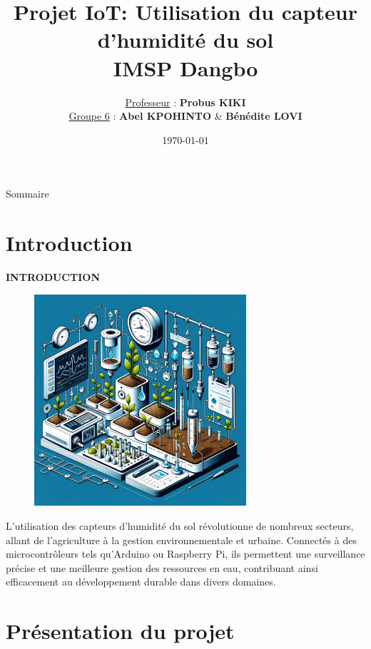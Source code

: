 \documentclass{beamer}
\title{ Projet IoT: Utilisation du capteur d'humidité du sol \\ {\small IMSP Dangbo} }
\author{{\small \underline{Professeur} :} \textbf{Probus KIKI} \\ {\small \underline{Groupe 6} :} \textbf{Abel KPOHINTO} \& \textbf{Bénédite LOVI}}
\date{\today}
\begin{document}
	
	\frame{\titlepage}
	\begin{frame}{Sommaire}
    		\tableofcontents
	\end{frame}
	
	\section{ Introduction }
	\begin{frame}{\textbf{INTRODUCTION}}
	\begin{figure}
    \centering
    \includegraphics[width=0.7\textwidth]{intro.png}
	\end{figure}

        L'utilisation des capteurs d'humidité du sol révolutionne de nombreux secteurs, allant de l'agriculture à la gestion environnementale et urbaine. Connectés à des microcontrôleurs tels qu'Arduino ou Raspberry Pi, ils permettent une surveillance précise et une meilleure gestion des ressources en eau, contribuant ainsi efficacement au développement durable dans divers domaines.

	\end{frame}
	\section{Présentation du projet}
\end{document}

